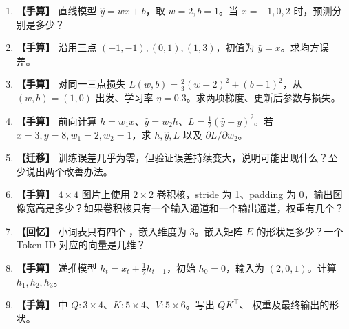 \begin{enumerate}[label=\textbf{C1-\arabic*.},leftmargin=2.8em]
\item {}\label{exercise:C1-1}  \label{exercise:linked-00-functions}  \textbf{【手算】} 直线模型 $\widehat y=wx+b$，取 $w=2,b=1$。当 $x=-1,0,2$ 时，预测分别是多少？
\item {}\label{exercise:C1-2}   \textbf{【手算】} 沿用三点 $(-1,-1),(0,1),(1,3)$，初值为 $\widehat y=x$。求均方误差。
\item {}\label{exercise:C1-3}   \textbf{【手算】} 对同一三点损失 $L(w,b)=\tfrac23(w-2)^2+(b-1)^2$，从 $(w,b)=(1,0)$ 出发、学习率 $\eta=0.3$。求两项梯度、更新后参数与损失。
\item {}\label{exercise:C1-4}  \label{exercise:linked-17-backpropagation}  \textbf{【手算】} 前向计算 $h=w_1x$、$\widehat y=w_2h$、$L=\tfrac12(\widehat y-y)^2$。若 $x=3,y=8,w_1=2,w_2=1$，求 $h,\widehat y,L$ 以及 $\partial L/\partial w_2$。
\item {}\label{exercise:C1-5}   \textbf{【迁移】} 训练误差几乎为零，但验证误差持续变大，说明可能出现什么？至少说出两个改善办法。
\item {}\label{exercise:C1-6}  \label{exercise:linked-19-cnn}  \textbf{【手算】} $4\times4$ 图片上使用 $2\times2$ 卷积核，stride 为 1、padding 为 0，输出图像宽高是多少？如果卷积核只有一个输入通道和一个输出通道，权重有几个？
\item {}\label{exercise:C1-7}  \label{exercise:linked-20-embeddings}  \textbf{【回忆】} 小词表只有四个 ，嵌入维度为 3。嵌入矩阵 $E$ 的形状是多少？一个 Token ID 对应的向量是几维？
\item {}\label{exercise:C1-8}   \textbf{【手算】} 递推模型 $h_t=x_t+\frac12h_{t-1}$，初始 $h_0=0$，输入为 $(2,0,1)$。计算 $h_1,h_2,h_3$。
\item {}\label{exercise:C1-9}   \textbf{【手算】}  中 $Q:3\times4$、$K:5\times4$、$V:5\times6$。写出 $QK^\top$、 权重及最终输出的形状。

\end{enumerate}
